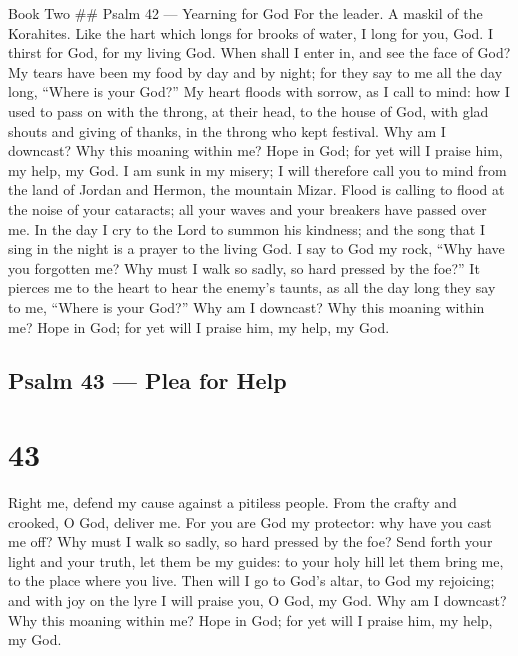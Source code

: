 Book Two \#\# Psalm 42 --- Yearning for God For the leader. A maskil of
the Korahites.  Like the hart which longs for brooks of
water, I long for you, God.  I thirst for God, for my living
God. When shall I enter in, and see the face of God?  My
tears have been my food by day and by night; for they say to me all the
day long, ``Where is your God?''  My heart floods with
sorrow, as I call to mind: how I used to pass on with the throng, at
their head, to the house of God, with glad shouts and giving of thanks,
in the throng who kept festival.  Why am I downcast? Why
this moaning within me? Hope in God; for yet will I praise him, my help,
my God.  I am sunk in my misery; I will therefore call you
to mind from the land of Jordan and Hermon, the mountain Mizar.
 Flood is calling to flood at the noise of your cataracts;
all your waves and your breakers have passed over me.  In
the day I cry to the Lord to summon his kindness; and the song that I
sing in the night is a prayer to the living God.  I say to
God my rock, ``Why have you forgotten me? Why must I walk so sadly, so
hard pressed by the foe?''  It pierces me to the heart to
hear the enemy's taunts, as all the day long they say to me, ``Where is
your God?''  Why am I downcast? Why this moaning within me?
Hope in God; for yet will I praise him, my help, my God.

\hypertarget{psalm-43-plea-for-help}{%
\subsection{Psalm 43 --- Plea for Help}\label{psalm-43-plea-for-help}}

\hypertarget{section-42}{%
\section{43}\label{section-42}}

 Right me, defend my cause against a pitiless people. From
the crafty and crooked, O God, deliver me.  For you are God
my protector: why have you cast me off? Why must I walk so sadly, so
hard pressed by the foe?  Send forth your light and your
truth, let them be my guides: to your holy hill let them bring me, to
the place where you live.  Then will I go to God's altar, to
God my rejoicing; and with joy on the lyre I will praise you, O God, my
God.  Why am I downcast? Why this moaning within me? Hope in
God; for yet will I praise him, my help, my God.

